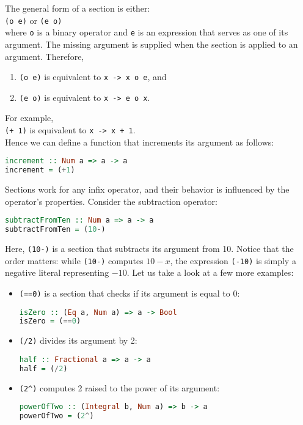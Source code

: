 The general form of a section is either:
\\[0.2cm]
\hspace*{1.3cm}
\texttt{(o e)} \quad or \quad \texttt{(e o)}
\\[0.2cm]
where \texttt{o} is a binary operator and \texttt{e} is an expression that serves as one of its
argument.  The missing argument is supplied when the section is applied to an argument.  Therefore,
\begin{enumerate}
\item \texttt{(o e)} \quad is equivalent to \quad \texttt{x -> x o e}, and
\item \texttt{(e o)} \quad is equivalent to \quad \texttt{x -> e o x}.
\end{enumerate}
For example, 
\\[0.2cm]
\hspace*{1.3cm}
\texttt{(+ 1)} \quad is equivalent to \quad \texttt{x -> x + 1}.
\\[0.2cm]
Hence we can define a function that increments its argument as follows:
\begin{lstlisting}[style=haskellstyle, language=Haskell]
increment :: Num a => a -> a
increment = (+1)
\end{lstlisting}

Sections work for any infix operator, and their behavior is influenced by the operator’s
properties. Consider the subtraction operator: 
\begin{lstlisting}[style=haskellstyle, language=Haskell]
subtractFromTen :: Num a => a -> a
subtractFromTen = (10-)
\end{lstlisting}
Here, \texttt{(10-)} is a section that subtracts its argument from 10.  Notice that the order
matters: while \texttt{(10-)} computes $10 - x$, the expression \texttt{(-10)} is simply a negative
literal representing $-10$.  Let us take a look at a few more examples:
\begin{itemize}
  \item \texttt{(==0)} is a section that checks if its argument is equal to 0:
\begin{lstlisting}[style=haskellstyle, language=Haskell]
isZero :: (Eq a, Num a) => a -> Bool
isZero = (==0)
\end{lstlisting}
  \item \texttt{(/2)} divides its argument by 2:
\begin{lstlisting}[style=haskellstyle, language=Haskell]
half :: Fractional a => a -> a
half = (/2)
\end{lstlisting}
  \item \texttt{(2\^{ })} computes 2 raised to the power of its argument:
\begin{lstlisting}[style=haskellstyle, language=Haskell]
powerOfTwo :: (Integral b, Num a) => b -> a
powerOfTwo = (2^)
\end{lstlisting}
\end{itemize}

